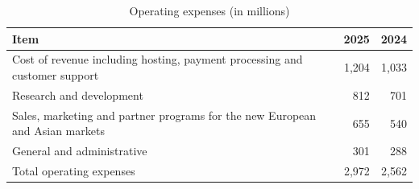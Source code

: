 \documentclass{article}\pagestyle{empty}
\begin{document}
\begin{table}[h]\centering\caption{Operating expenses (in millions)}
\begin{tabular}{p{5cm}rr}\hline
Item & 2025 & 2024 \\ \hline
Cost of revenue including hosting, payment processing and customer support & 1,204 & 1,033 \\ \hline
Research and development & 812 & 701 \\ \hline
Sales, marketing and partner programs for the new European and Asian markets & 655 & 540 \\ \hline
General and administrative & 301 & 288 \\ \hline
Total operating expenses & 2,972 & 2,562 \\ \hline
\end{tabular}\end{table}
\end{document}

